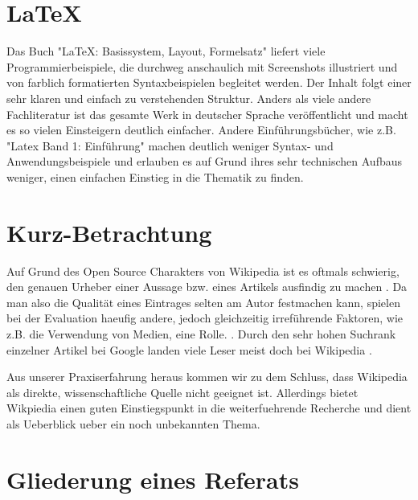\documentclass{wa}
\begin{document}
\section{LaTeX}

  Das Buch "LaTeX: Basissystem, Layout, Formelsatz" \cite{braune2006} liefert viele Programmierbeispiele, die durchweg anschaulich mit Screenshots illustriert und von farblich formatierten Syntaxbeispielen begleitet werden. Der Inhalt folgt einer sehr klaren und einfach zu verstehenden Struktur. Anders als viele andere Fachliteratur ist das gesamte Werk in deutscher Sprache veröffentlicht und macht es so vielen Einsteigern deutlich einfacher. Andere Einführungsbücher, wie z.B. "Latex Band 1: Einführung" machen deutlich weniger Syntax- und Anwendungsbeispiele und erlauben es auf Grund ihres sehr technischen Aufbaus weniger, einen einfachen Einstieg in die Thematik zu finden.
  \newline


\section{Kurz-Betrachtung}

  Auf Grund des Open Source Charakters von Wikipedia ist es oftmals schwierig, den genauen Urheber einer Aussage bzw. eines Artikels ausfindig zu machen \cite{waters2007}.
  Da man also die Qualität eines Eintrages selten am Autor festmachen kann, spielen bei der Evaluation haeufig andere, jedoch gleichzeitig irreführende Faktoren, wie z.B. die Verwendung von Medien, eine Rolle. \cite{lucassen2010}.
  Durch den sehr hohen Suchrank einzelner Artikel bei Google landen viele Leser meist doch bei Wikipedia \cite{waters2007}.

  Aus unserer Praxiserfahrung heraus kommen wir zu dem Schluss, dass Wikipedia als direkte, wissenschaftliche Quelle nicht geeignet ist. Allerdings bietet Wikpiedia einen guten Einstiegspunkt in die weiterfuehrende Recherche und dient als Ueberblick ueber ein noch unbekannten Thema.
  \newline


\section{Gliederung eines Referats}
\end{document}

